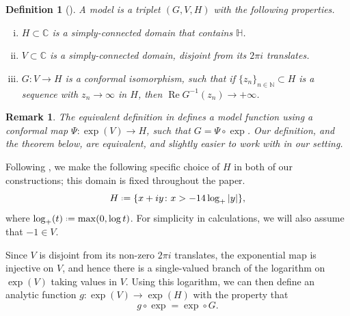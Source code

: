 \documentclass[a4paper, 11pt, reqno]{amsart}
\numberwithin{equation}{section}
\theoremstyle{plain}
\newtheorem{definition}[theorem]{Definition}
\newcommand*{\defeq}{\mathrel{\vcenter{\baselineskip0.5ex \lineskiplimit0pt
 \hbox{\scriptsize.}\hbox{\scriptsize.}}}=}
\newtheorem*{remark}{Remark}%
\theoremstyle{remark}
\newcommand{\C}{{\mathbb{C}}}
\newcommand{\N}{{\mathbb{N}}}
\newcommand{\Rea}{\operatorname{Re }}
\begin{document}
\begin{definition}[{\cite[Definition 1.6]{lasse_model14}}]\label{def:model}\normalfont
	A \emph{model} is a triplet $(G, V, H)$ with the following properties.
	\begin{enumerate}[(i)]
		\item $H \subset \C$ is a simply-connected domain that contains $\mathbb{H}$.
		\item $V \subset \C$ is a simply-connected domain, disjoint from its $2\pi i$ translates.
		\item $G \colon V \rightarrow H$ is a conformal isomorphism, such that if $\{z_n\}_{n\in\N}\subset H$ is a sequence with $z_n \rightarrow \infty$ in $H$, then $\Rea G^{-1}(z_n)\rightarrow +\infty$.
	\end{enumerate}
\end{definition}

\begin{remark}\normalfont
	The equivalent definition in \cite{lasse_model14} defines a model function using a conformal map $\Psi \colon \exp(V) \to H$, such that $G = \Psi \circ \exp$. Our definition, and the theorem below, are equivalent, and slightly easier to work with in our setting.
\end{remark}

Following \cite{lasse_model14}, we make the following specific choice of $H$ in both of our constructions; this domain is fixed throughout the paper.
\begin{equation}
	\label{eq_H}
	H \defeq \{ x+iy \colon x> -14\log_+\vert y\vert \},
\end{equation}
where $\log_+(t)\defeq \max(0, \log t)$. For simplicity in calculations, we will also assume that $-1\in V$.

Since $V$ is disjoint from its non-zero $2 \pi i$ translates, the exponential map is injective on $V$, and hence there is a single-valued branch of the logarithm on $\exp(V)$ taking values in $V$. Using this logarithm, we can then define an analytic function $g \colon \exp(V) \to \exp(H)$ with the property that
\begin{equation}
	\label{eq:gG}
	g \circ \exp = \exp \circ G.
\end{equation} 
\end{document}
